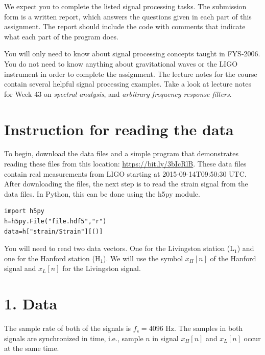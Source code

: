 We expect you to complete the listed signal processing tasks. The
submission form is a written report, which answers the questions given
in each part of this assignment. The report should include the code
with comments that indicate what each part of the program does.


You will only need to know about signal processing concepts taught in
FYS-2006. You do not need to know anything about gravitational waves
or the LIGO instrument in order to complete the assignment. The
lecture notes for the course contain several helpful signal processing
examples. Take a look at lecture notes for Week 43 on \emph{spectral
analysis}, and \emph{arbitrary frequency response filters}.


\section{Instruction for reading the data}

To begin, download the data files and a simple program that
demonstrates reading these files from this location:
\url{https://bit.ly/3bIcRlB}. These data files contain real
measurements from LIGO starting at 2015-09-14T09:50:30 UTC. After
downloading the files, the next step is to read the strain signal from
the data files. In Python, this can be done using the h5py module.
\begin{verbatim}
import h5py
h=h5py.File("file.hdf5","r")
data=h["strain/Strain"][()]
\end{verbatim}
You will need to read two data vectors. One for the Livingston station
(L$_1$) and one for the Hanford station (H$_1$). We will use the symbol $x_H[n]$
of the Hanford signal and $x_L[n]$ for the Livingston signal.

\section{1. Data}
The sample rate of both of the signals is $f_s=4096$ Hz. The samples
in both signals are synchronized in time, i.e., sample $n$ in signal
$x_H[n]$ and $x_L[n]$ occur at the same time.

